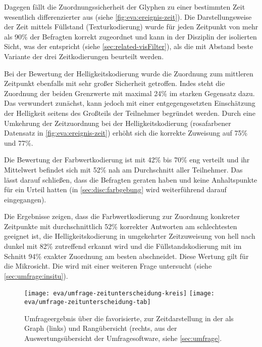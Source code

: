 Dagegen fällt die Zuordnungssicherheit der Glyphen zu einer bestimmten Zeit wesentlich differenzierter aus (siehe \autoref{fig:eva:ereignis-zeit}). Die Darstellungsweise der Zeit mittels Füllstand (Texturkodierung) wurde für jeden Zeitpunkt von mehr als 90\% der Befragten korrekt zugeordnet und kann in der Disziplin der isolierten Sicht, was der  entspricht (siehe \autoref{sec:related-visFilter}), als die mit Abstand beste Variante der drei Zeitkodierungen beurteilt werden.

Bei der Bewertung der Helligkeitskodierung wurde die Zuordnung zum mittleren Zeitpunkt ebenfalls mit sehr großer Sicherheit getroffen. Indes steht die Zuordnung der beiden Grenzwerte mit maximal 24\% im starken Gegensatz dazu. Das verwundert zunächst, kann jedoch mit einer entgegengesetzten Einschätzung der Helligkeit seitens des Großteils der Teilnehmer begründet werden. Durch eine Umkehrung der Zeitzuordnung bei der Helligkeitskodierung (rosafarbener Datensatz in \autoref{fig:eva:ereignis-zeit}) erhöht sich die korrekte Zuweisung auf 75\% und 77\%.

Die Bewertung der Farbwertkodierung ist mit 42\% bis 70\% eng verteilt und ihr Mittelwert befindet sich mit 52\% nah am Durchschnitt aller Teilnehmer. Das lässt darauf schließen, dass die Befragten geraten haben und keine Anhaltspunkte für ein Urteil hatten (in \autoref{sec:disc:farbgebung} wird weiterführend darauf eingegangen). 

Die Ergebnisse zeigen, dass die Farbwertkodierung zur Zuordnung konkreter Zeitpunkte mit durchschnittlich 52\% korrekter Antworten am schlechtesten geeignet ist, die Helligkeitskodierung in umgekehrter Zeitzuweisung von hell nach dunkel mit 82\% zutreffend erkannt wird und die Füllstandskodierung mit im Schnitt 94\% exakter Zuordnung am besten abschneidet. Diese Wertung gilt für die Mikrosicht. Die  wird mit einer weiteren Frage untersucht (siehe \autoref{sec:umfrage:insitu}).

\begin{figure}
	\texttt{[image: eva/umfrage-zeitunterscheidung-kreis]}
	\hspace*{.04\textwidth}%
	\texttt{[image: eva/umfrage-zeitunterscheidung-tab]}
	\caption{Umfrageergebnis über die favorisierte,  zur Zeitdarstellung in der  als Graph (links) und Rangübersicht (rechts, aus der Auswertungsübersicht der Umfragesoftware, siehe \autoref{sec:umfrage}.}\label{fig:eva:ereignis-zeitunterscheidung}
\end{figure}

